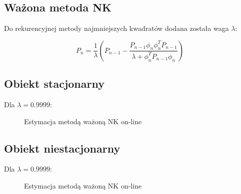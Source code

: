 \documentclass{article}
\begin{document}
\subsection{Ważona metoda NK}
Do rekurencyjnej metody najmniejszych kwadratów dodana została waga \( \lambda \):

\begin{equation}
P_n = \frac{1}{\lambda} (P_{n-1} - \frac{P_{n-1} \phi_n \phi_n^T  P_{n-1}}{\lambda + \phi_n^T P_{n-1} \phi_n} )
\end{equation}

\subsection{Obiekt stacjonarny}

Dla \( \lambda = 0.9999 \):

\begin{figure}[ht]
\centering
{}
\caption{Estymacja metodą ważoną NK on-line}
\end{figure}

\subsection{Obiekt niestacjonarny}

Dla \( \lambda = 0.9999 \):

\begin{figure}[ht]
\centering
{}
\caption{Estymacja metodą ważoną NK on-line}
\end{figure}
\end{document}
